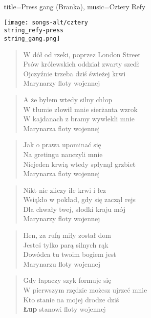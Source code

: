\newpage
\begin{song}{title={Press gang (Branka)}, music={Cztery Refy}}
    \begin{center}
        \texttt{[image: songs-alt/cztery\\string\_refy-press\\string\_gang.png]}
    \end{center}
\begin{multicols}{2}
    \begin{verse}
        W dół od rzeki, poprzez London Street \\
        Psów królewskich oddział zwarty szedł \\
        Ojczyźnie trzeba dziś świeżej krwi \\
        Marynarzy floty wojennej
    \end{verse}
    \begin{verse}
        A że byłem wtedy silny chłop\\
        W tłumie złowił mnie sierżanta wzrok \\
        W kajdanach z bramy wywlekli mnie \\
        Marynarza floty wojennej
    \end{verse}
    \begin{verse}
        Jak o prawa upominać się \\
        Na gretingu nauczyli mnie \\
        Niejeden krwią wtedy spłynął grzbiet \\
        Marynarza floty wojennej
    \end{verse}
    \begin{verse}
        Nikt nie zliczy ile krwi i łez \\
        Wsiąkło w pokład, gdy się zaczął rejs \\
        Dla chwały twej, słodki kraju mój \\
        Marynarzy floty wojennej
    \end{verse}
    \begin{verse}
        Hen, za rufą miły został dom \\
        Jesteś tylko parą silnych rąk \\
        Dowódca tu twoim bogiem jest \\
        Marynarzu floty wojennej
    \end{verse}
    \begin{verse}
        Gdy łapaczy szyk formuje się \\
        W pierwszym rzędzie możesz ujrzeć mnie \\
        Kto stanie na mojej drodze dziś \\
        \textbf{Łup} stanowi floty wojennej
    \end{verse}
\end{multicols}
\end{song}
